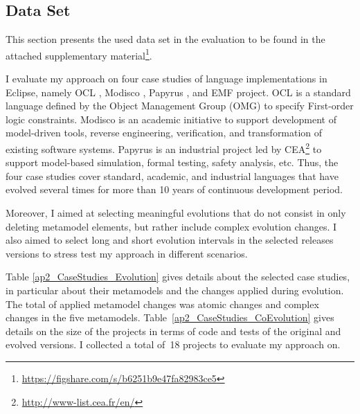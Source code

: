 \subsection{Data Set}

This section presents the used data set in the evaluation to be found in the attached supplementary material\footnote{\url{https://figshare.com/s/b6251b9e47fa82983ce5}}. 



I evaluate my approach on four case studies of language implementations in Eclipse, namely OCL \cite{MDTOCL}, Modisco \cite{MDTModisco}, Papyrus \cite{MDTPapyrus}, and EMF \cite{EclipseEMF} project. 
%
OCL is a standard language defined by the Object Management Group (OMG) to specify First-order logic constraints. Modisco is an academic initiative to support development of model-driven tools, reverse engineering, verification, and transformation of existing software systems. 
Papyrus is an industrial project led by CEA\footnote{\url{http://www-list.cea.fr/en/}} to support model-based simulation, formal testing, safety analysis, etc. 
Thus, the four case studies cover standard, academic, and industrial languages that have evolved several times for more than 10 years of continuous development period. 

Moreover, I aimed at selecting meaningful evolutions that do not consist in only deleting metamodel elements, but rather include complex evolution changes. I also aimed to select long and short evolution intervals in the selected releases versions to stress test my approach in different scenarios. 


Table \ref{ap2_CaseStudies_Evolution} gives details about the selected case studies, in particular about their metamodels and the changes applied during evolution. 
The total of applied metamodel changes was  atomic changes and  complex changes in the five metamodels.
%
Table~\ref{ap2_CaseStudies_CoEvolution} gives details on the size of the projects in terms of code and tests of the original and evolved versions. 
I collected a total of~18 projects to evaluate my approach on.  



